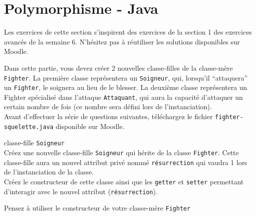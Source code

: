 
% 

\section{Polymorphisme - Java}

Les exercices de cette section s'inspirent des exercices de la section 1 des exercices avancés de la semaine 6.
N'hésitez pas à réutiliser les solutions disponibles sur Moodle.

Dans cette partie, vous devez créer 2 nouvelles classe-filles de la classe-mère \lstinline{Fighter}. La première classe représentera un \lstinline{Soigneur}, qui, lorsqu'il ``attaquera'' un \lstinline{Fighter}, le soignera au lieu de le blesser. La deuxième classe représentera un Fighter spécialisé dans l'attaque \lstinline{Attaquant}, qui aura la capacité d'attaquer un certain nombre de fois (ce nombre sera défini lors de l'instanciation).\\

Avant d'effectuer la série de questions suivantes, téléchargez le fichier \lstinline{fighter-squelette.java} disponible sur Moodle.\\

% 

\begin{Exercice}[5 minutes] classe-fille \lstinline{Soigneur} \\
Créez une nouvelle classe-fille \lstinline{Soigneur} qui hérite de la classe \lstinline{Fighter}. Cette classe-fille aura un nouvel attribut privé nommé \lstinline{résurrection} qui vaudra 1 lors de l'instanciation de la classe. \\

Créez le constructeur de cette classe ainsi que les \lstinline{getter} et \lstinline{setter} permettant d'interagir avec le nouvel attribut (\lstinline{résurrection}). \\

\begin{conseil}
Pensez à utiliser le constructeur de votre classe-mère \lstinline{Fighter}
\end{conseil}

\begin{solution}
	
\end{solution}

\end{Exercice}

